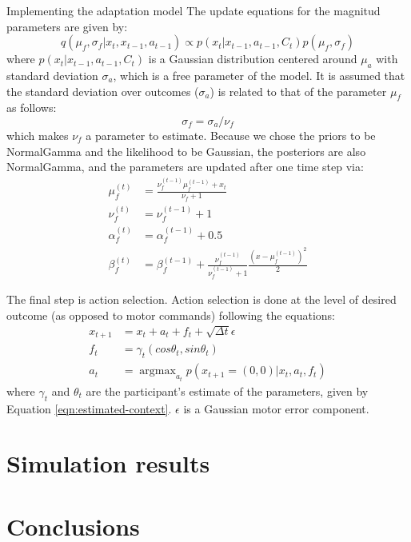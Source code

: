 \documentclass{report}
\DeclareMathOperator*{\argmax}{argmax}
\def \eref #1{Equation \ref{#1}}   %
\begin{document}
\begin{chapter}{Implementing the adaptation model}
The update equations for the magnitud parameters are given by:
\begin{equation}
q(\mu_f, \sigma_f | x_t, x_{t-1}, a_{t-1}) \propto p(x_t |
x_{t-1}, a_{t-1}, C_t)p(\mu_f, \sigma_f) \label{eqn:context-from-x}
\end{equation}
where $p(x_t | x_{t-1}, a_{t-1}, C_t)$ is a Gaussian distribution centered
around $\mu_a$ with standard deviation $\sigma_a$, which is a free parameter of
the model. It is assumed that the standard deviation over outcomes ($\sigma_a$)
is related to that of the parameter $\mu_f$ as follows:
\begin{equation}
\sigma_f = \sigma_a / \nu_f
\end{equation}
which makes $\nu_f$ a parameter to estimate. Because we chose the priors to be
NormalGamma and the likelihood to be Gaussian, the posteriors are also
NormalGamma, and the parameters are updated after one time step via:
\begin{align}
  \mu_f^{(t)} &= \frac{\nu_f^{(t-1)} \mu_f^{(t-1)} + x_t}{\nu_f + 1} \\
  \nu_f^{(t)} &= \nu_f^{(t-1)} + 1 \\
  \alpha_f^{(t)} &= \alpha_f^{(t-1)} + 0.5 \\
  \beta_f^{(t)} &= \beta_f^{(t-1)} + \frac{\nu_f^{(t-1)}}{\nu_f^{(t-1)} +
                  1}\frac{\left(x - \mu_f^{(t-1)}\right)^2}{2}
\end{align}


The final step is action selection. Action selection is done at the level of
desired outcome (as opposed to motor commands) following the equations:
\begin{align}
  x_{t+1} &= x_t + a_t + f_t + \sqrt{\Delta
            t}\epsilon\\ \label{eqn:dynamics}
  f_t &= \gamma_t (cos\theta_t, sin\theta_t) \\
  a_t &= \argmax_{a_t}p(x_{t+1} = (0, 0) | x_t, a_t, f_t)
\end{align}
where $\gamma_t$ and $\theta_t$ are the participant's estimate of
the parameters, given by \eref{eqn:estimated-context}. $\epsilon$ is a Gaussian
motor error component.

\section{Simulation results}

\section{Conclusions}



\end{chapter}







\end{document}
